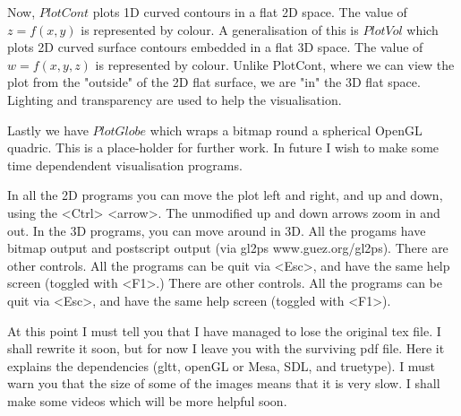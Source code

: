 \documentclass[12pt]{article}
\begin{document}
Now, $PlotCont$ plots 1D curved contours in a flat 2D space. 
The value of $z=f(x,y)$ is represented by colour.
A generalisation of this is $PlotVol$ which plots 2D curved
 surface contours embedded in a flat 3D space. The value
of $w=f(x,y,z)$ is represented by colour. Unlike PlotCont,
 where we can view the plot from the "outside" of the 2D
flat surface, we are "in" the 3D flat space. Lighting and
transparency are used to help the visualisation.

Lastly we have $PlotGlobe$ which wraps a bitmap round
a spherical OpenGL quadric. This is a place-holder for
further work. In future I wish to make some time dependendent
 visualisation programs. 

In all the 2D programs you can move the plot left
and right, and up and down, using the <Ctrl> <arrow>.
The unmodified up and down arrows zoom in and out.
In the 3D programs, you can move around in 3D.
All the progams have bitmap output and postscript
output (via gl2ps www.guez.org/gl2ps). There are other
controls. All the programs can be quit via <Esc>, and
 have the same help screen (toggled with <F1>.) There are other
controls. All the programs can be quit via <Esc>, and
 have the same help screen (toggled with <F1>).


At this point I must tell you that I have managed to lose the
original tex file. I shall rewrite it soon, but for
now I leave you with the surviving pdf file. Here it
explains the dependencies (gltt, openGL or Mesa, SDL, and truetype).
I must warn you that the size of some of the images means that
it is very slow. I shall make some videos which will be more helpful
soon.
\end{document}
